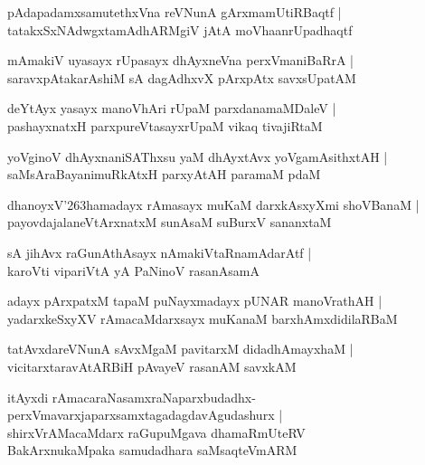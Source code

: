 \documentclass[twoside,12pt,openright]{book}
\def\S{\char'263}
\newcounter{shloka}[chapter]
\begin{document}
\begin{shloka}%
pAdapadamxsamutethxVna reVNunA gArxmamUtiRBaqtf |\\
tatakxSxNAdwgxtamAdhARMgiV jAtA moVhaanrUpadhaqtf 
\end{shloka}

\begin{shloka}%
mAmakiV uyasayx rUpasayx dhAyxneVna perxVmaniBaRrA |\\
saravxpAtakarAshiM sA dagAdhxvX pArxpAtx savxsUpatAM 
\end{shloka}

\begin{shloka}%
deYtAyx yasayx manoVhAri rUpaM parxdanamaMDaleV |\\
pashayxnatxH parxpureVtasayxrUpaM vikaq tivajiRtaM 
\end{shloka}

\begin{shloka}%
yoVginoV dhAyxnaniSAThxsu yaM dhAyxtAvx yoVgamAsithxtAH |\\
saMsAraBayanimuRkAtxH parxyAtAH paramaM pdaM 
\end{shloka}

\begin{shloka}%
dhanoyxV\S hamadayx rAmasayx muKaM darxkAsxyXmi shoVBanaM |\\
payovdajalaneVtArxnatxM sunAsaM suBurxV sananxtaM 
\end{shloka}

\begin{shloka}%
sA jihAvx raGunAthAsayx nAmakiVtaRnamAdarAtf |\\
karoVti vipariVtA yA PaNinoV rasanAsamA
\end{shloka}

\begin{shloka}%
adayx pArxpatxM tapaM puNayxmadayx pUNAR manoVrathAH |\\
yadarxkeSxyXV rAmacaMdarxsayx muKanaM barxhAmxdidilaRBaM 
\end{shloka}

\begin{shloka}%
tatAvxdareVNunA sAvxMgaM pavitarxM didadhAmayxhaM |\\
vicitarxtaravAtARBiH pAvayeV rasanAM savxkAM 
\end{shloka}

\begin{shloka}%
itAyxdi rAmacaraNasamxraNaparxbudadhx-\\
perxVmavarxjaparxsamxtagadagdavAgudashurx |\\
shirxVrAMacaMdarx raGupuMgava dhamaRmUteRV \\
BakArxnukaMpaka samudadhara saMsaqteVmARM 
\end{shloka}
\end{document}
